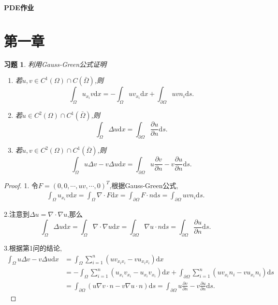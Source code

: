 \documentclass[a4paper,oneside,12pt]{ctexart}
\theoremstyle{plain}
\newtheorem{exercise}{习题}
\theoremstyle{nonumberplain}
\theoremstyle{nonumberplain}
\newtheorem{proof}{证明.}
\newcommand{\dif}{\mathrm{d}}
\newcommand{\ptl}{\partial}
\begin{document}
    \begin{center}
        \LARGE\bfseries
        PDE作业
    \end{center}

    \section{第一章}
    
    \begin{exercise}\label{ex:1.1}
        利用Gauss-Green公式证明
        \begin{enumerate}
            \item 若$u,v\in C^1(\Omega)\cap C(\bar{\Omega})$,则\begin{equation*}
                \int_\Omega u_{x_i}v\dif x=-\int_\Omega uv_{x_i}\dif x+\int_{\ptl\Omega} uvn_i\dif s.
            \end{equation*}
            \item 若$u\in C^2(\Omega)\cap C^1(\bar{\Omega})$,则\begin{equation*}
                \int_\Omega \Delta u\dif x=\int_{\ptl\Omega}\frac{\ptl u}{\ptl n}\dif s.
            \end{equation*}
            \item 若$u,v\in C^2(\Omega)\cap C^1(\bar{\Omega})$,则\begin{equation*}
                \int_\Omega u\Delta v-v\Delta u\dif x=\int_{\ptl \Omega}u\frac{\ptl v}{\ptl n}-v\frac{\ptl u}{\ptl n}\dif s.
            \end{equation*}
        \end{enumerate}
    \end{exercise}

    \begin{proof}
        1. 令$F=(0,0,\cdots,uv,\cdots,0)^T$,根据Gauss-Green公式, 
        \begin{align*}
            \int_\Omega u_{x_i}v\dif x=\int_\Omega \nabla\cdot F\dif x=\int_{\ptl\Omega}F\cdot n\dif s=\int_{\ptl\Omega}uvn_i\dif s.
        \end{align*}

        2.注意到$\Delta u=\nabla\cdot \nabla u$,那么
        \begin{equation*}
            \int_\Omega \Delta u\dif x=\int_\Omega \nabla\cdot\nabla u\dif x=\int_{\ptl\Omega} \nabla u\cdot n\dif s=\int_{\ptl\Omega}\frac{\ptl u}{\ptl n}\dif s.
        \end{equation*}

        3.根据第1问的结论,
        \begin{align*}
            \int_\Omega u\Delta v-v\Delta u\dif x&=\int_\Omega \sum_{i=1}^n\left(uv_{x_ix_i}-vu_{x_ix_i}\right)\dif x\\
            &=-\int_\Omega\sum_{i=1}^n(u_{x_i}v_{x_i}-u_{x_i}v_{x_i})\dif x+\int_{\ptl\Omega}\sum_{i=1}^n(uv_{x_i}n_i-vu_{x_i}n_i)\dif s\\
            &=\int_{\ptl\Omega}(u\nabla v\cdot n-v\nabla u\cdot n)\dif s=\int_{\ptl \Omega}u\frac{\ptl v}{\ptl n}-v\frac{\ptl u}{\ptl n}\dif s.
        \end{align*}
        \ 
    \end{proof}
\end{document}
